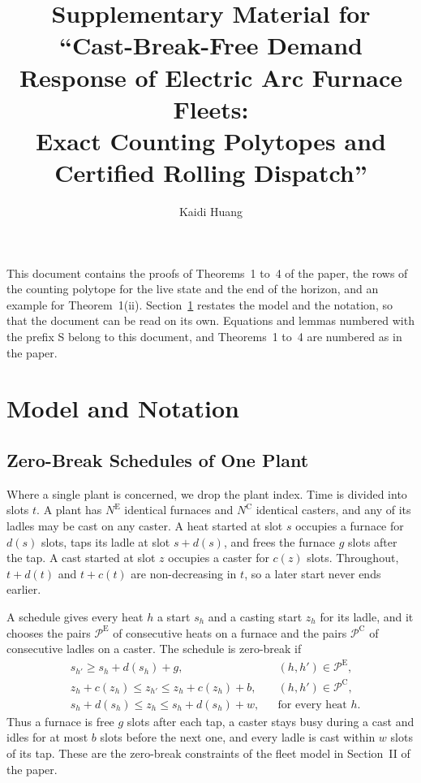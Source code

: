 \documentclass[11pt]{article}
\title{Supplementary Material for\\ ``Cast-Break-Free Demand Response of Electric Arc Furnace Fleets:\\ Exact Counting Polytopes and Certified Rolling Dispatch''}
\author{Kaidi Huang}
\date{}
\newcommand{\NE}{N^{\mathrm{E}}}
\newcommand{\NC}{N^{\mathrm{C}}}
\newcommand{\calP}{\mathcal{P}}
\begin{document}
\maketitle

This document contains the proofs of Theorems~1 to~4 of the paper, the rows of the counting polytope for the live
state and the end of the horizon, and an example for Theorem~1(ii). Section~\ref{sec:model} restates the model and the
notation, so that the document can be read on its own. Equations and lemmas numbered with the prefix S belong to this
document, and Theorems~1 to~4 are numbered as in the paper.

\section{Model and Notation}\label{sec:model}

\subsection{Zero-Break Schedules of One Plant}

Where a single plant is concerned, we drop the plant index. Time is divided into slots $t$. A plant has $\NE$ identical
furnaces and $\NC$ identical casters, and any of its ladles may be cast on any caster. A heat started at slot $s$
occupies a furnace for $d(s)$ slots, taps its ladle at slot $s+d(s)$, and frees the furnace $g$ slots after the tap. A
cast started at slot $z$ occupies a caster for $c(z)$ slots. Throughout, $t+d(t)$ and $t+c(t)$ are non-decreasing in
$t$, so a later start never ends earlier.

A schedule gives every heat $h$ a start $s_h$ and a casting start $z_h$ for its ladle, and it chooses the pairs
$\calP^{\mathrm E}$ of consecutive heats on a furnace and the pairs $\calP^{\mathrm C}$ of consecutive ladles on a
caster. The schedule is zero-break if
\begin{subequations}\label{eq:zb}
\begin{align}
& s_{h'}\ge s_h+d(s_h)+g, && (h,h')\in\calP^{\mathrm E}, \label{eq:zb-furn}\\
& z_h+c(z_h)\le z_{h'}\le z_h+c(z_h)+b, && (h,h')\in\calP^{\mathrm C}, \label{eq:zb-cast}\\
& s_h+d(s_h)\le z_h\le s_h+d(s_h)+w, && \text{for every heat } h. \label{eq:zb-ladle}
\end{align}
\end{subequations}
Thus a furnace is free $g$ slots after each tap, a caster stays busy during a cast and idles for at most $b$ slots
before the next one, and every ladle is cast within $w$ slots of its tap. These are the zero-break constraints of the
fleet model in Section~II of the paper.
\end{document}
